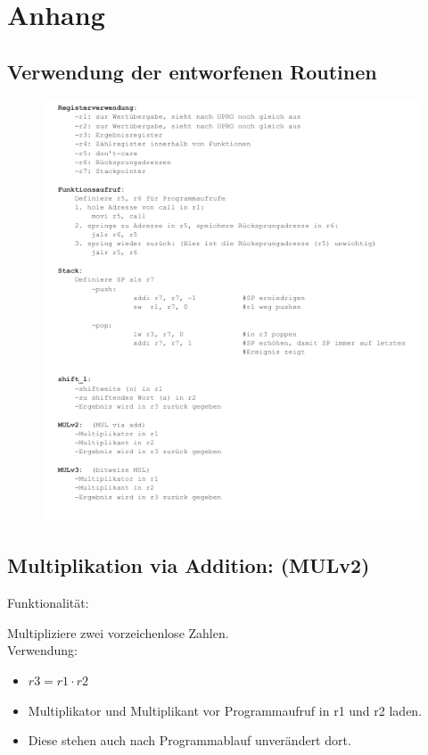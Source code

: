 \documentclass[fleqn, a4paper, 11pt]{article}       %
\begin{document}
\section{Anhang}
\subsection{Verwendung der entworfenen Routinen}

\begin{figure}[h]
    \includegraphics[width =1\textwidth]{Manual.png}
\end{figure}

\newpage

\subsection{Multiplikation via Addition: (MULv2)\label{A.MULv2}}
Funktionalität:

Multipliziere zwei vorzeichenlose Zahlen.
\\

\noindent Verwendung:
\begin{itemize}
    \item $r3 = r1 \cdot r2$
	\item Multiplikator und Multiplikant vor Programmaufruf  in r1                und r2 laden.
	\item Diese stehen auch nach Programmablauf unverändert                dort.
\end{itemize}
\end{document}
